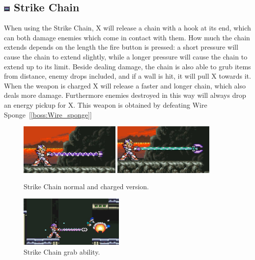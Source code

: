 \subsection{\includegraphics[width=12px, height=10px]{figures/X2/weapons/S_chain.png} Strike Chain}\label{Strike_chain}
When using the Strike Chain, X will release a chain with a hook at its end, which can both damage enemies which come in contact with them. How much the chain extends depends on the length the fire button is pressed: a short pressure will cause the chain to extend slightly, while a longer pressure will cause the chain to extend up to its limit. Beside dealing damage, the chain is also able to grub items from distance, enemy drops included, and if a wall is hit, it will pull X towards it. When the weapon is charged X will release a faster and longer chain, which also deals more damage. Furthermore enemies destroyed in this way will always drop an energy pickup for X. This weapon is obtained by defeating Wire Sponge~[\ref{boss:Wire_sponge}]

\begin{figure}[htp]
	\centering
	\includegraphics[height=2.5cm]{figures/X2/weapons/S_chain_1.png}	
	\includegraphics[height=2.5cm]{figures/X2/weapons/S_chain_2.png}	
	\caption{Strike Chain normal and charged version.}
\end{figure}
\begin{figure}[htp]
	\centering
	\includegraphics[height=2.5cm]{figures/X2/weapons/S_chain_grub.jpg}	
	\caption{Strike Chain grab ability.}
\end{figure}

